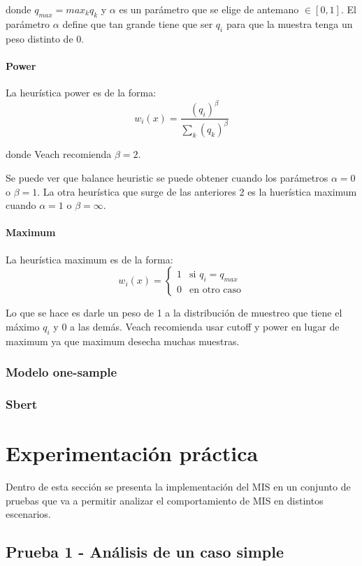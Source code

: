 \documentclass{article}
\begin{document}
donde $q_{max} = max_{k} q_{k}$ y $\alpha$ es un parámetro que se elige de antemano $\in [0, 1]$.
El parámetro $\alpha$ define que tan grande tiene que ser $q_{i}$ para que la muestra tenga un peso distinto de 0.

\paragraph{Power} La heurística power es de la forma:
$$ w_{i}(x) = \frac{(q_{i})^{\beta}}{\sum_{k} (q_{k})^{\beta}}$$

donde Veach recomienda $\beta = 2$.

Se puede ver que balance heuristic se puede obtener cuando los parámetros $\alpha = 0$ o $\beta = 1$.
La otra heurística que surge de las anteriores 2 es la huerística maximum cuando $\alpha = 1$ o $\beta = \infty$.

\paragraph{Maximum} La heurística maximum es de la forma:
$$ w_{i}(x) = \begin{cases} 1 & \text{si } q_{i} = q_{max} \\ 0 & \text{en otro caso} \end{cases}$$

Lo que se hace es darle un peso de 1 a la distribución de muestreo que tiene el máximo $q_{i}$ y 0 a las demás.
Veach recomienda usar cutoff y power en lugar de maximum ya que maximum desecha muchas muestras.

\subsubsection{Modelo one-sample}

\subsubsection{Sbert}

\section{Experimentación práctica}

Dentro de esta sección se presenta la implementación del MIS en un conjunto de pruebas que va a permitir analizar el comportamiento de MIS en distintos escenarios.

\subsection{Prueba 1 - Análisis de un caso simple}
\end{document}
